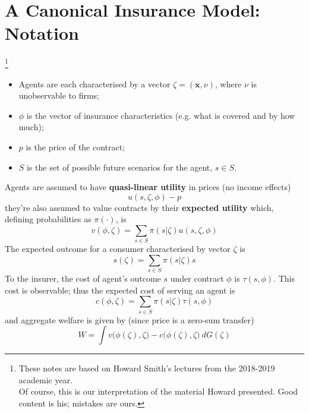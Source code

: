 \documentclass[11pt]{article}
\numberwithin{equation}{section}
\newcommand\blfootnote[1]{%
	\begingroup
	\renewcommand\thefootnote{}\footnote{#1}%
	\addtocounter{footnote}{-1}%
	\endgroup
}
\begin{document}
\onehalfspacing

\section{A Canonical Insurance Model: Notation}
\blfootnote{These notes are based on Howard Smith's lectures from the 2018-2019 academic year.\\
Of course, this is our interpretation of the material Howard presented. Good content is his; mistakes are ours.}

\vspace{-1cm}
\begin{itemize}
 \item Agents are each characterised by a vector $\zeta = (\textbf{x}, \nu)$, where $\nu$ is unobservable to firms;
 \item $\phi$ is the vector of insurance characteristics (e.g. what is covered and by how much);
 \item $p$ is the price of the contract;
 \item $S$ is the set of possible future scenarios for the agent, $s \in S$.
\end{itemize}
Agents are assumed to have \textbf{quasi-linear utility} in prices (no income effects)
\begin{equation}
	\label{agentutility}
	u(s, \zeta, \phi) - p
\end{equation}
they're also assumed to value contracts by their \textbf{expected utility} which, defining probabilities as $\pi(\cdot)$, is
\begin{equation}
	\label{eu}
	v(\phi, \zeta) = \sum_{s \in S} \pi(s|\zeta)u(s, \zeta, \phi)
\end{equation}
The expected outcome for a consumer characterised by vector $\zeta$ is
\begin{equation}
	s(\zeta) = \sum_{s \in S} \pi(s|\zeta)s
\end{equation}
To the insurer, the cost of agent's outcome $s$ under contract $\phi$ is $\tau(s,\phi)$. This cost is observable; thus the expected cost of serving an agent is
\begin{equation}
	\label{cost}
	c(\phi, \zeta) = \sum_{s \in S} \pi(s|\zeta) \tau(s, \phi)
\end{equation}
and aggregate welfare is given by (since price is a zero-sum transfer)
\begin{equation}
\label{welfare}
	W = \int v\big( \phi(\zeta), \zeta \big) - c\big( \phi(\zeta), \zeta \big)~ dG(\zeta)
\end{equation}
\end{document}
